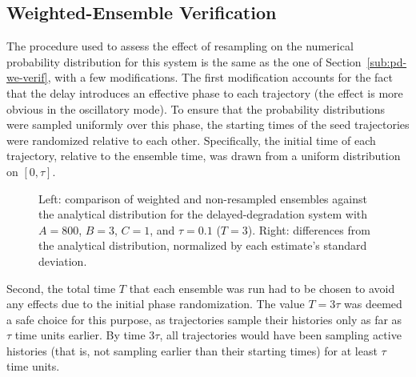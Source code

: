 \documentclass[english,letterpaper,12pt]{report}
\begin{document}
\begin{doublespacing}
\subsection{Weighted-Ensemble Verification} %
\label{sub:dd-we-verif}

The procedure used to assess the effect of resampling on the numerical probability distribution for this system is the same as the one of Section~\ref{sub:pd-we-verif}, with a few modifications. The first modification accounts for the fact that the delay introduces an effective phase to each trajectory (the effect is more obvious in the oscillatory mode). To ensure that the probability distributions were sampled uniformly over this phase, the starting times of the seed trajectories were randomized relative to each other. Specifically, the initial time of each trajectory, relative to the ensemble time, was drawn from a uniform distribution on $[0, \tau]$.

\begin{figure}[tbp]
    \makebox[\linewidth][c]{
        \begin{subfigure}{3in}
            \begin{center}
                
            \end{center}
            \label{sfg:ddwe0-comp}
        \end{subfigure}
        \begin{subfigure}{3in}
            \begin{center}
                
            \end{center}
            \label{sfg:ddwe0-chi}
        \end{subfigure}
    }
    \caption{Left: comparison of weighted and non-resampled ensembles against the analytical distribution for the delayed-degradation system with $A=800$, $B=3$, $C=1$, and $\tau=0.1$ ($T=3$). Right: differences from the analytical distribution, normalized by each estimate's standard deviation.}
    \label{fig:ddwe0}
\end{figure}

Second, the total time $T$ that each ensemble was run had to be chosen to avoid any effects due to the initial phase randomization. The value $T = 3\tau$ was deemed a safe choice for this purpose, as trajectories sample their histories only as far as $\tau$ time units earlier. By time $3\tau$, all trajectories would have been sampling active histories (that is, not sampling earlier than their starting times) for at least $\tau$ time units.


\end{doublespacing}
\end{document}
